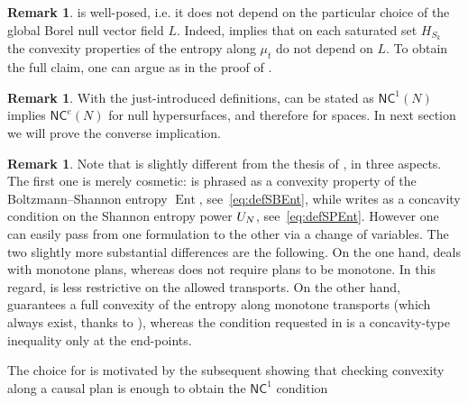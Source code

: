 \documentclass[12pt,a4paper]{amsart}
\theoremstyle{plain}
\theoremstyle{definition}
\newtheorem{remark}[lemma]{Remark}
\numberwithin{equation}{section}
\DeclareMathOperator{\Ent}{Ent}
\newcommand{\NC}{\mathsf{NC}}
\begin{document}
\begin{remark}\label{rem:NCeNoL}
 is well-posed, i.e. it does not depend on the
particular choice of the global Borel null vector field $L$. Indeed,
 implies that on each 
saturated set $H_{S_k}$ the convexity properties of the entropy along $\mu_t$ do not depend on $L$. 
To obtain the full claim, one can argue as in the proof of .
\end{remark}





\begin{remark}\label{R:implications}
With the just-introduced definitions,
 can be stated as $\NC^1(N)$ implies
$\NC^e(N)$ for null hypersurfaces, and therefore for spaces.
%
In next section we will prove the converse implication.
\end{remark}

\begin{remark}
  Note that  is slightly different from
  the thesis of , in three
  aspects. The first one is merely cosmetic:  is phrased as a convexity property of the Boltzmann--Shannon entropy $\Ent$, see~\eqref{eq:defSBEnt}, while  writes as a concavity condition on the Shannon entropy power ${\rm U}_N$,  see~\eqref{eq:defSPEnt}. However one can easily pass from one formulation to the other via a change of variables. The two slightly more substantial differences are the following.
  On the one hand,  deals with monotone plans, whereas  does not require plans to be monotone. In this regard,  is less restrictive on the allowed transports.
  On the other hand,  guarantees a full convexity of the
  entropy along monotone transports (which always exist, thanks to ), whereas the condition requested in   is a concavity-type inequality only at
 the end-points.
 

 
 
The choice
  for  is motivated by the subsequent
   showing that checking convexity
  along a causal plan is enough to obtain the $\NC^{1}$ condition 
  \end{remark}
\end{document}
